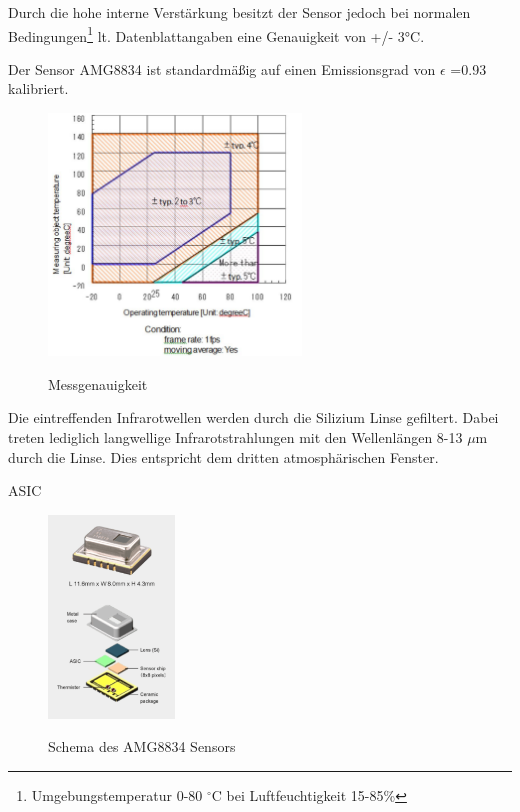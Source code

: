 Durch die hohe interne Verstärkung besitzt der Sensor jedoch bei normalen Bedingungen\footnote[2]{Umgebungstemperatur 0-80 $^\circ$C bei Luftfeuchtigkeit 15-85\%} lt. Datenblattangaben eine Genauigkeit von +/- 3°C. 





Der Sensor AMG8834 ist standardmäßig auf einen Emissionsgrad von $\epsilon$ =0.93 kalibriert.

\begin{figure}[H]
	\centering
	\includegraphics[width=0.6\textwidth]
	{fig/accuracy.PNG}
	\caption[Messgenauigkeit]{Messgenauigkeit} \protect\cite{AMG8834}
	\label{fig:Temperaturbereich}
\end{figure}


Die eintreffenden Infrarotwellen werden durch die Silizium Linse gefiltert. Dabei treten lediglich langwellige  Infrarotstrahlungen mit den Wellenlängen 8-13 $\mu$m durch die Linse. Dies entspricht dem dritten atmosphärischen Fenster.


\ac{ASIC}

\begin{figure}[H]
	\centering
	\includegraphics[width=0.3\textwidth]
	{fig/grid_eye_aufbau.PNG}
	\caption[Schema des AMG8834 Sensors]{Schema des AMG8834 Sensors} \protect\cite{AMG8834}
	\label{fig:Explosionsdarstellung}
\end{figure}







